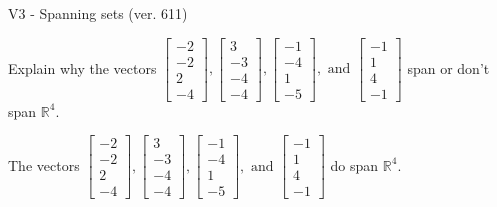 \begin{exercise}
  \begin{exerciseTitle}V3 - Spanning sets (ver. 611)\end{exerciseTitle}
  \begin{exerciseStatement}
    Explain why the vectors \(\left[\begin{array}{r}
-2 \\
-2 \\
2 \\
-4
\end{array}\right] , \left[\begin{array}{r}
3 \\
-3 \\
-4 \\
-4
\end{array}\right] , \left[\begin{array}{r}
-1 \\
-4 \\
1 \\
-5
\end{array}\right] , \text{ and } \left[\begin{array}{r}
-1 \\
1 \\
4 \\
-1
\end{array}\right]\) span or don't span \(\mathbb{R}^4\). 
	


  \end{exerciseStatement}
  \begin{exerciseAnswer}
   The vectors \(\left[\begin{array}{r}
-2 \\
-2 \\
2 \\
-4
\end{array}\right] , \left[\begin{array}{r}
3 \\
-3 \\
-4 \\
-4
\end{array}\right] , \left[\begin{array}{r}
-1 \\
-4 \\
1 \\
-5
\end{array}\right] , \text{ and } \left[\begin{array}{r}
-1 \\
1 \\
4 \\
-1
\end{array}\right]\) 
  	 do  
	span \(\mathbb{R}^4\).
  


  \end{exerciseAnswer}
\end{exercise}